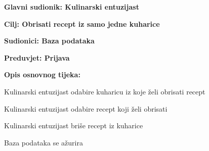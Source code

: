 					\noindent {}
					\begin{packed_item}
	
						\item \textbf{Glavni sudionik: Kulinarski entuzijast}
						\item  \textbf{Cilj: Obrisati recept iz samo jedne kuharice}
						\item  \textbf{Sudionici: Baza podataka}
						\item  \textbf{Preduvjet: Prijava } 
						\item  \textbf{Opis osnovnog tijeka:}
						
						\item[] \begin{packed_enum}
	
							\item Kulinarski entuzijast odabire kuharicu iz koje želi obrisati recept
							\item Kulinarski entuzijast odabire recept koji želi obrisati
							\item Kulinarski entuzijast briše recept iz kuharice
							\item Baza podataka se ažurira
						\end{packed_enum}
					\end{packed_item}
					
